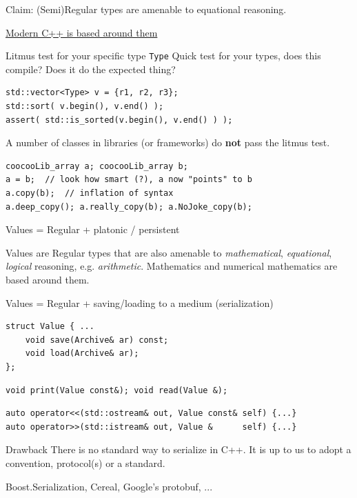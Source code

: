 \documentclass[t,aspectratio=169,handout]{beamer}
\begin{document}
\begin{frame}[fragile]{Claim: (Semi)Regular types are amenable to equational reasoning.}

	\underline{Modern C++ is based around them}

	\begin{alertblock}{Litmus test for your specific type \lstinline{Type}}
		Quick test for your types, does this compile? Does it do the expected thing?
\begin{lstlisting}
std::vector<Type> v = {r1, r2, r3};
std::sort( v.begin(), v.end() );
assert( std::is_sorted(v.begin(), v.end() ) );
\end{lstlisting}
\end{alertblock}

A number of classes in libraries (or frameworks) do \textbf{not} pass the litmus test.
\begin{lstlisting}
coocooLib_array a; coocooLib_array b;
a = b;  // look how smart (?), a now "points" to b
a.copy(b);  // inflation of syntax
a.deep_copy(); a.really_copy(b); a.NoJoke_copy(b);
\end{lstlisting}

\end{frame}

\begin{frame}[fragile]{Values = Regular + platonic / persistent}

Values are Regular types that are also amenable to \emph{mathematical}, \emph{equational}, \emph{logical} reasoning, e.g. \emph{arithmetic}.
Mathematics and numerical mathematics are based around them.

\pause

Values = Regular + saving/loading to a medium (serialization)

\begin{lstlisting}
struct Value { ...
	void save(Archive& ar) const;
	void load(Archive& ar);
};
\end{lstlisting}
	\begin{lstlisting}
void print(Value const&); void read(Value &);
\end{lstlisting}
	\begin{lstlisting}
auto operator<<(std::ostream& out, Value const& self) {...}
auto operator>>(std::istream& out, Value &      self) {...}
\end{lstlisting}

	\begin{alertblock}{Drawback}
		There is no standard way to serialize in C++.
		It is up to us to adopt a convention, protocol(s) or a standard.
	\end{alertblock}

	Boost.Serialization, Cereal, Google's protobuf, ...
\end{frame}
\end{document}
